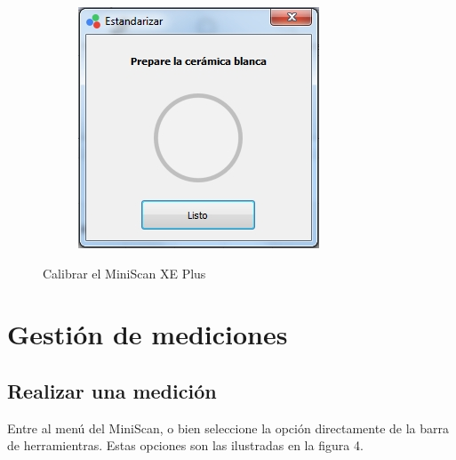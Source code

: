 \begin{figure}[H]
\begin{subfigure}{.33\textwidth}
  \centering
  \includegraphics[width=.9\linewidth]{./img/estandarizar-blanco.jpg}
\end{subfigure}
\caption{Calibrar el MiniScan XE Plus}
\end{figure}

\section{Gesti\'{o}n de mediciones}
	
	\subsection{Realizar una medici\'{o}n}
	
	Entre al men\'{u} del MiniScan, o bien seleccione la opci\'{o}n directamente de la barra de herramientras. Estas opciones son las ilustradas en la figura 4.
	
